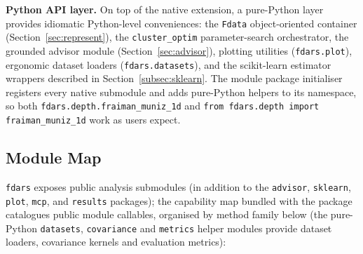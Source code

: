\textbf{Python API layer.}  On top of the native extension, a pure-Python
layer provides idiomatic Python-level conveniences: the \texttt{Fdata}
object-oriented container (Section~\ref{sec:represent}), the
\texttt{cluster\_optim} parameter-search orchestrator, the grounded advisor
module (Section~\ref{sec:advisor}), plotting utilities (\texttt{fdars.plot}),
ergonomic dataset loaders (\texttt{fdars.datasets}), and the scikit-learn
estimator wrappers described in Section~\ref{subsec:sklearn}.  The module
package initialiser registers every native submodule and adds pure-Python
helpers to its namespace, so both \texttt{fdars.depth.fraiman\_muniz\_1d} and
\texttt{from fdars.depth import fraiman\_muniz\_1d} work as users expect.

\subsection{Module Map}

\texttt{fdars} exposes \nsubmodules{} public analysis submodules (in
addition to the \texttt{advisor}, \texttt{sklearn}, \texttt{plot},
\texttt{mcp}, and \texttt{results} packages); the capability map
bundled with the package catalogues \npubliccallables{} public module
callables, organised by method family below (the pure-Python
\texttt{datasets}, \texttt{covariance} and \texttt{metrics} helper modules
provide dataset loaders, covariance kernels and evaluation metrics):

